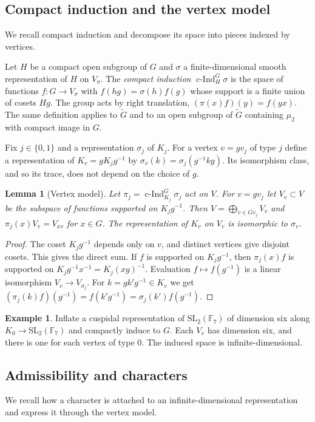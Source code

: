 \documentclass[12pt,letterpaper]{article}
\numberwithin{equation}{section}
\newtheorem{lemma}[theorem]{Lemma}
\theoremstyle{definition}
\newtheorem{example}[theorem]{Example}
\theoremstyle{remark}
\newcommand{\Mp}{\widetilde G}
\newcommand{\cInd}{\operatorname{c-Ind}}
\begin{document}
\subsection{Compact induction and the vertex model}
We recall compact induction and decompose its space into pieces indexed by vertices.

Let $H$ be a compact open subgroup of $G$ and $\sigma$ a finite-dimensional smooth representation of $H$ on $V_\sigma$. The \emph{compact induction} $\cInd_H^G\sigma$ is the space of functions $f:G\to V_\sigma$ with $f(hg)=\sigma(h)f(g)$ whose support is a finite union of cosets $Hg$. The group acts by right translation, $(\pi(x)f)(y)=f(yx)$. The same definition applies to $\Mp$ and to an open subgroup of $\Mp$ containing $\mu_2$ with compact image in $G$.

Fix $j\in\{0,1\}$ and a representation $\sigma_j$ of $K_j$. For a vertex $v=gv_j$ of type $j$ define a representation of $K_v=gK_jg^{-1}$ by $\sigma_v(k)=\sigma_j(g^{-1}kg)$. Its isomorphism class, and so its trace, does not depend on the choice of $g$.

\begin{lemma}[Vertex model]\label{lem:model}
Let $\pi_j=\cInd_{K_j}^G\sigma_j$ act on $V$. For $v=gv_j$ let $V_v\subset V$ be the subspace of functions supported on $K_jg^{-1}$. Then $V=\bigoplus_{v\in Gv_j}V_v$ and $\pi_j(x)V_v=V_{xv}$ for $x\in G$. The representation of $K_v$ on $V_v$ is isomorphic to $\sigma_v$.
\end{lemma}
\begin{proof}
The coset $K_jg^{-1}$ depends only on $v$, and distinct vertices give disjoint cosets. This gives the direct sum. If $f$ is supported on $K_jg^{-1}$, then $\pi_j(x)f$ is supported on $K_jg^{-1}x^{-1}=K_j(xg)^{-1}$. Evaluation $f\mapsto f(g^{-1})$ is a linear isomorphism $V_v\to V_{\sigma_j}$. For $k=gk'g^{-1}\in K_v$ we get $(\pi_j(k)f)(g^{-1})=f(k'g^{-1})=\sigma_j(k')f(g^{-1})$.
\end{proof}

\begin{example}
Inflate a cuspidal representation of $\mathrm{SL}_2(\mathbb F_7)$ of dimension six along $K_0\to\mathrm{SL}_2(\mathbb F_7)$ and compactly induce to $G$. Each $V_v$ has dimension six, and there is one for each vertex of type $0$. The induced space is infinite-dimensional.
\end{example}

\subsection{Admissibility and characters}
We recall how a character is attached to an infinite-dimensional representation and express it through the vertex model.
\end{document}
